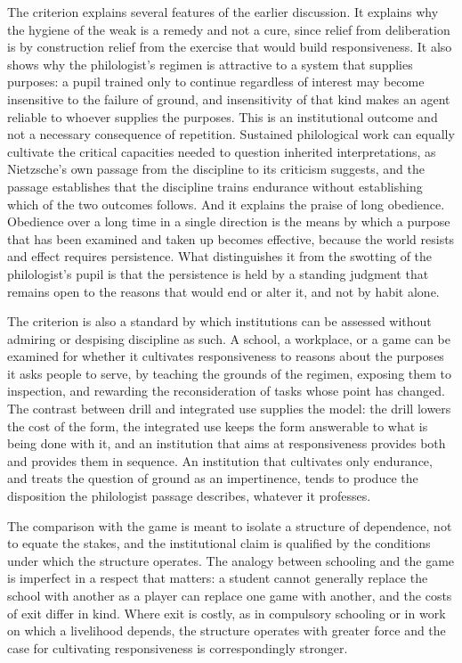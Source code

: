 \documentclass[11pt]{article}
\begin{document}
The criterion explains several features of the earlier discussion. It explains why the hygiene of the weak is a remedy and not a cure, since relief from deliberation is by construction relief from the exercise that would build responsiveness. It also shows why the philologist's regimen is attractive to a system that supplies purposes: a pupil trained only to continue regardless of interest may become insensitive to the failure of ground, and insensitivity of that kind makes an agent reliable to whoever supplies the purposes. This is an institutional outcome and not a necessary consequence of repetition. Sustained philological work can equally cultivate the critical capacities needed to question inherited interpretations, as Nietzsche's own passage from the discipline to its criticism suggests, and the passage establishes that the discipline trains endurance without establishing which of the two outcomes follows. And it explains the praise of long obedience. Obedience over a long time in a single direction is the means by which a purpose that has been examined and taken up becomes effective, because the world resists and effect requires persistence. What distinguishes it from the swotting of the philologist's pupil is that the persistence is held by a standing judgment that remains open to the reasons that would end or alter it, and not by habit alone.

The criterion is also a standard by which institutions can be assessed without admiring or despising discipline as such. A school, a workplace, or a game can be examined for whether it cultivates responsiveness to reasons about the purposes it asks people to serve, by teaching the grounds of the regimen, exposing them to inspection, and rewarding the reconsideration of tasks whose point has changed. The contrast between drill and integrated use supplies the model: the drill lowers the cost of the form, the integrated use keeps the form answerable to what is being done with it, and an institution that aims at responsiveness provides both and provides them in sequence. An institution that cultivates only endurance, and treats the question of ground as an impertinence, tends to produce the disposition the philologist passage describes, whatever it professes.

The comparison with the game is meant to isolate a structure of dependence, not to equate the stakes, and the institutional claim is qualified by the conditions under which the structure operates. The analogy between schooling and the game is imperfect in a respect that matters: a student cannot generally replace the school with another as a player can replace one game with another, and the costs of exit differ in kind. Where exit is costly, as in compulsory schooling or in work on which a livelihood depends, the structure operates with greater force and the case for cultivating responsiveness is correspondingly stronger.
\end{document}
